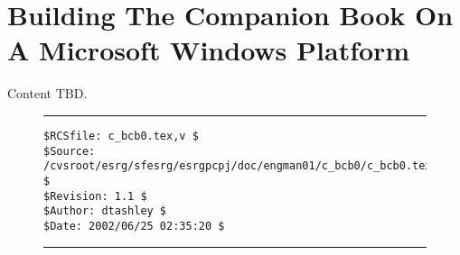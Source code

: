 %
\chapter{Building The Companion Book On A Microsoft Windows Platform}
\label{cbcb0}

Content TBD.


\noindent\begin{figure}[!b]
\noindent\rule[-0.25in]{\textwidth}{1pt}
\begin{tiny}
\begin{verbatim}
$RCSfile: c_bcb0.tex,v $
$Source: /cvsroot/esrg/sfesrg/esrgpcpj/doc/engman01/c_bcb0/c_bcb0.tex,v $
$Revision: 1.1 $
$Author: dtashley $
$Date: 2002/06/25 02:35:20 $
\end{verbatim}
\end{tiny}
\noindent\rule[0.25in]{\textwidth}{1pt}
\end{figure}
%
